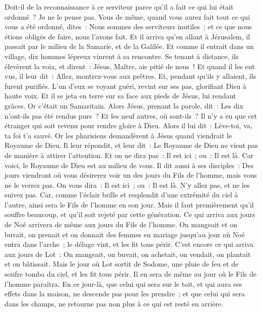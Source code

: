 \begin{multicols}{2}
Doit-il de la reconnaissance à ce serviteur parce qu'il a fait ce qui lui était ordonné~? Je ne le pense pas.
Vous de même, quand vous aurez fait tout ce qui vous a été ordonné, dites~: Nous sommes des serviteurs inutiles~; et ce que nous étions obligés de faire, nous l'avons fait.
Et il arriva qu'en allant à Jérusalem, il passait par le milieu de la Samarie, et de la Galilée.
Et comme il entrait dans un village, dix hommes lépreux vinrent à sa rencontre. Se tenant à distance, ils élevèrent la voix, et dirent~:
Jésus, Maître, aie pitié de nous~!
Et quand il les eut vus, il leur dit~: Allez, montrez-vous aux prêtres. Et, pendant qu'ils y allaient, ils furent purifiés.
L'un d'eux se voyant guéri, revint sur ses pas, glorifiant Dieu à haute voix.
Et il se jeta en terre sur sa face aux pieds de Jésus, lui rendant grâces. Or c'était un Samaritain.
Alors Jésus, prenant la parole, dit~: Les dix n'ont-ils pas été rendus purs~? Et les neuf autres, où sont-ils~?
Il n'y a eu que cet étranger qui soit revenu pour rendre gloire à Dieu.
Alors il lui dit~: Lève-toi, va, ta foi t'a sauvé.
Or les pharisiens demandèrent à Jésus quand viendrait le Royaume de Dieu. Il leur répondit, et leur dit~: Le Royaume de Dieu ne vient pas de manière à attirer l'attention.
Et on ne dira pas~: Il est ici~; ou~: Il est là. Car voici, le Royaume de Dieu est au milieu de vous.
Il dit aussi à ses disciples~: Des jours viendront où vous désirerez voir un des jours du Fils de l'homme, mais vous ne le verrez pas. On vous dira~:
Il est ici~; ou~: Il est là. N'y allez pas, et ne les suivez pas.
Car, comme l'éclair brille et resplendit d'une extrémité du ciel à l'autre, ainsi sera le Fils de l'homme en son jour.
Mais il faut premièrement qu'il souffre beaucoup, et qu'il soit rejeté par cette génération.
Ce qui arriva aux jours de Noé arrivera de même aux jours du Fils de l'homme.
On mangeait et on buvait, on prenait et on donnait des femmes en mariage jusqu'au jour où Noé entra dans l'arche~; le déluge vint, et les fit tous périr.
C'est encore ce qui arriva aux jours de Lot~: On mangeait, on buvait, on achetait, on vendait, on plantait et on bâtissait.
Mais le jour où Lot sortit de Sodome, une pluie de feu et de soufre tomba du ciel, et les fit tous périr.
Il en sera de même au jour où le Fils de l'homme paraîtra.
En ce jour-là, que celui qui sera sur le toit, et qui aura ses effets dans la maison, ne descende pas pour les prendre~; et que celui qui sera dans les champs, ne retourne pas non plus à ce qui est resté en arrière.

\end{multicols}
